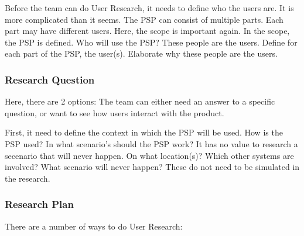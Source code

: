 \documentclass[10pt]{report}
\begin{document}
Before the team can do User Research, it needs to define who the users are. It is more complicated than it seems. The PSP can consist of multiple parts. Each part may have different users. Here, the scope is important again. In the scope, the PSP is  defined. Who will use the PSP? These people are the users. Define for each part of the PSP, the user(s). Elaborate why these people are the users.

\subsubsection{Research Question}

Here, there are 2 options: The team can either need an answer to a specific question, or want to see how users interact with the product.

First, it need to define the context in which the PSP will be used. How is the PSP used? In what scenario's should the PSP work? It has no value to research a secenario that will never happen. On what location(s)? Which other systems are involved? What scenario will never happen? These do not need to be simulated in the research.

\subsubsection{Research Plan}

There are a number of ways to do User Research:
\end{document}
